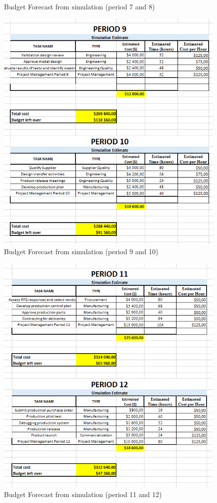 \begin{appendices}
\begin{figure}[H]
\caption{Budget Forecast from simulation (period 7 and 8)}
\end{figure}
\begin{figure}[H]
\includegraphics[scale=1]{budget_forecast_sim_910.PNG}
\caption{Budget Forecast from simulation (period 9 and 10)}
\end{figure}
\begin{figure}[H]
\includegraphics[scale=1]{budget_forecast_sim_1112.PNG}
\caption{Budget Forecast from simulation (period 11 and 12)}
\end{figure}


\end{appendices}
